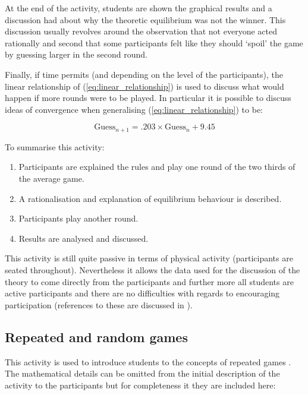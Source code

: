 \documentclass{article}
\begin{document}
At the end of the activity, students are shown the graphical results and a
discussion had about why the theoretic equilibrium was not the winner. This
discussion usually revolves around the observation that not everyone acted
rationally and second that some participants felt like they should `spoil' the
game by guessing larger in the second round.

Finally, if time permits (and depending on the level of the participants), the
linear relationship of (\ref{eq:linear_relationship}) is used to discuss what
would happen if more rounds were to be played. In particular it is possible to
discuss ideas of convergence when generalising (\ref{eq:linear_relationship}) to
be:

\begin{equation}
    \text{Guess}_{n+1} = .203\times\text{Guess}_n + 9.45
    \label{eq:extrapolated_linear_relationship}
\end{equation}

To summarise this activity:

\begin{enumerate}
    \item Participants are explained the rules and play one round of the two
        thirds of the average game.
    \item A rationalisation and explanation of equilibrium behaviour is
        described.
    \item Participants play another round.
    \item Results are analysed and discussed.
\end{enumerate}

This activity is still quite passive in terms of physical activity (participants are
seated throughout). Nevertheless it allows the data used for the discussion of
the theory to come directly from the participants and further more all students
are active participants and there are no difficulties with regards to
encouraging participation (references to these are discussed in \cite{Rocca2010}).

\subsection{Repeated and random games}\label{sec:repeated_games}

This activity is used to introduce students to the concepts of repeated games
\cite{Maschler2013}. The mathematical details can be omitted from the initial
description of the activity to the participants but for completeness it they are
included here:
\end{document}

